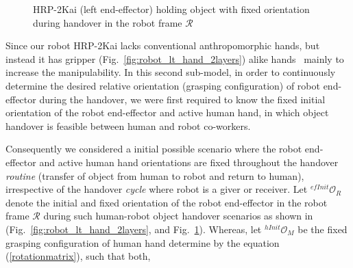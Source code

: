 \begin{figure}[htpb]
	\caption{HRP-2Kai (left end-effector) holding object with fixed orientation during handover in the robot frame $\mathcal{R}$}
	\label{fig:robot_lt_hand_obj}
\end{figure} 


Since our robot HRP-2Kai lacks conventional anthropomorphic hands, but instead it has gripper (Fig.~\ref{fig:robot_lt_hand_2layers}) alike hands~\cite{kaneko2015humanoid, stasse2019overview} mainly to increase the manipulability. In this second sub-model, in order to continuously determine the desired relative orientation (grasping configuration) of robot end-effector during the handover, we were first required to know the fixed initial orientation of the robot end-effector and active human hand, in which object handover is feasible between human and robot co-workers. 

Consequently we considered a initial possible scenario where the robot end-effector and active human hand orientations are fixed throughout the handover \textit{routine} (transfer of object from human to robot and return to human), irrespective of the handover \textit{cycle} where robot is a giver or receiver. Let ${{}^{efInit}\mathcal{O}_R}$ denote the initial and fixed orientation of the robot end-effector in the robot frame $\mathcal{R}$ during such human-robot object handover scenarios as shown in (Fig.~\ref{fig:robot_lt_hand_2layers}, and Fig.~\ref{fig:robot_lt_hand_obj}). Whereas, let ${{}^{hInit}\mathcal{O}_M}$ be the fixed grasping configuration of human hand determine by the equation (\ref{rotationmatrix}), such that both,

